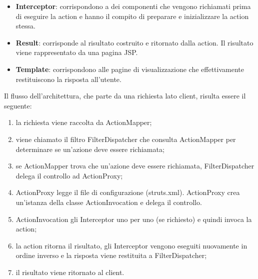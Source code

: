 \begin{itemize}
\item \textbf{Interceptor}: corrispondono a dei componenti che vengono richiamati prima di eseguire la action e hanno il compito di preparare e inizializzare la action stessa.
\setlength{\parskip}{3ex}

\item \textbf{Result}: corrisponde al risultato costruito e ritornato dalla action. Il risultato viene rappresentato da una pagina JSP.
\setlength{\parskip}{3ex}

\item \textbf{Template}: corrispondono alle pagine di visualizzazione che effettivamente restituiscono la risposta all'utente.
\setlength{\parskip}{3ex}

\end{itemize}

\pagebreak

\noindent Il flusso dell'architettura, che parte da una richiesta lato client, risulta essere il seguente:
\begin{enumerate}
\item la richiesta viene raccolta da ActionMapper;

\item viene chiamato il filtro FilterDispatcher che consulta ActionMapper per determinare se un'azione deve essere richiamata;

\item se ActionMapper trova che un'azione deve essere richiamata, FilterDispatcher delega il controllo ad ActionProxy;

\item ActionProxy legge il file di configurazione (struts.xml). ActionProxy crea un'istanza della classe ActionInvocation e delega il controllo.

\item ActionInvocation gli Interceptor uno per uno (se richiesto) e quindi invoca la action;

\item la action ritorna il risultato, gli Interceptor vengono eseguiti nuovamente in ordine inverso e la risposta viene restituita a FilterDispatcher;

\item il risultato viene ritornato al client.
\end{enumerate}

\pagebreak
